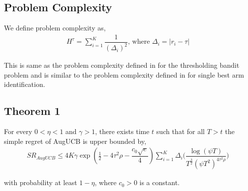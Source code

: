 

\subsection{Problem Complexity}

We define problem complexity as,
\begin{align*}
H^{\tau} = \sum_{i=1}^{K}\dfrac{1}{(\Delta_{i})^{2}} \text{, where } \Delta_{i}=|r_{i}-\tau|
\end{align*}

This is same as the problem complexity defined in \cite{locatelli2016optimal} for the thresholding bandit problem and is similar to the problem complexity defined in \cite{audibert2010best} for single best arm identification.


\subsection{Theorem 1}

\begin{theorem}
\label{Result:Theorem:1}

For every $0<\eta <1$ and $\gamma > 1$, there exists time $t$ such that for all $T>t$ the simple regret of AugUCB is upper bounded by,
\begin{align*}
SR_{AugUCB} \leq 4K \gamma \exp(\frac{1}{2}- 4\tau^{2}\rho -\dfrac{c_{0}\sqrt{e}}{4}) \sum_{i=1}^{K} \Delta_{i} \bigg(\dfrac{\log (\psi T )}{T^{\frac{3}{2}}(\psi T^2)^{4\tau^{2}\rho}}\bigg)
\end{align*}

with probability at least $1-\eta$, where $c_{0}>0$ is a constant.

\end{theorem}


